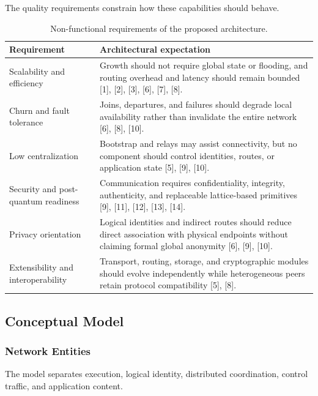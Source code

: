 \documentclass[12pt,a4paper]{article}
\begin{document}
The quality requirements constrain how these capabilities should behave.

\begin{table}[H]
\centering
\caption{Non-functional requirements of the proposed architecture.}
\label{tab:non-functional-requirements}
\begin{tabularx}{\textwidth}{L{0.27\textwidth} Y}
\toprule
\textbf{Requirement} & \textbf{Architectural expectation} \\
\midrule
Scalability and efficiency & Growth should not require global state or flooding, and routing overhead and latency should remain bounded [1], [2], [3], [6], [7], [8]. \\
Churn and fault tolerance & Joins, departures, and failures should degrade local availability rather than invalidate the entire network [6], [8], [10]. \\
Low centralization & Bootstrap and relays may assist connectivity, but no component should control identities, routes, or application state [5], [9], [10]. \\
Security and post-quantum readiness & Communication requires confidentiality, integrity, authenticity, and replaceable lattice-based primitives [9], [11], [12], [13], [14]. \\
Privacy orientation & Logical identities and indirect routes should reduce direct association with physical endpoints without claiming formal global anonymity [6], [9], [10]. \\
Extensibility and interoperability & Transport, routing, storage, and cryptographic modules should evolve independently while heterogeneous peers retain protocol compatibility [5], [8]. \\
\bottomrule
\end{tabularx}
\end{table}

\subsection{Conceptual Model}

\subsubsection{Network Entities}

The model separates execution, logical identity, distributed coordination, control traffic, and application content.
\end{document}
